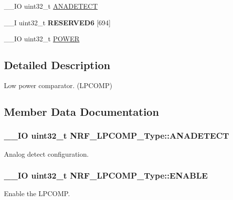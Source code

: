 \begin{DoxyCompactItemize}
\item 
\+\_\+\+\_\+\+I\+O uint32\+\_\+t \hyperlink{struct_n_r_f___l_p_c_o_m_p___type_a3a9d8832c07406639e71d4ef8eebc97d}{A\+N\+A\+D\+E\+T\+E\+C\+T}
\item 
\hypertarget{struct_n_r_f___l_p_c_o_m_p___type_abf695871e852e79340dd0864aaad2f6d}{}\+\_\+\+\_\+\+I uint32\+\_\+t {\bfseries R\+E\+S\+E\+R\+V\+E\+D6} \mbox{[}694\mbox{]}\label{struct_n_r_f___l_p_c_o_m_p___type_abf695871e852e79340dd0864aaad2f6d}

\item 
\+\_\+\+\_\+\+I\+O uint32\+\_\+t \hyperlink{struct_n_r_f___l_p_c_o_m_p___type_a8774f2108593ba450c031acfa5c921b7}{P\+O\+W\+E\+R}
\end{DoxyCompactItemize}


\subsection{Detailed Description}
Low power comparator. (L\+P\+C\+O\+M\+P) 

\subsection{Member Data Documentation}
\hypertarget{struct_n_r_f___l_p_c_o_m_p___type_a3a9d8832c07406639e71d4ef8eebc97d}{}
\subsubsection[{A\+N\+A\+D\+E\+T\+E\+C\+T}]{\setlength{\rightskip}{0pt plus 5cm}\+\_\+\+\_\+\+I\+O uint32\+\_\+t N\+R\+F\+\_\+\+L\+P\+C\+O\+M\+P\+\_\+\+Type\+::\+A\+N\+A\+D\+E\+T\+E\+C\+T}\label{struct_n_r_f___l_p_c_o_m_p___type_a3a9d8832c07406639e71d4ef8eebc97d}
Analog detect configuration. \hypertarget{struct_n_r_f___l_p_c_o_m_p___type_abbe9510d193085731e99182b8bf736db}{}
\subsubsection[{E\+N\+A\+B\+L\+E}]{\setlength{\rightskip}{0pt plus 5cm}\+\_\+\+\_\+\+I\+O uint32\+\_\+t N\+R\+F\+\_\+\+L\+P\+C\+O\+M\+P\+\_\+\+Type\+::\+E\+N\+A\+B\+L\+E}\label{struct_n_r_f___l_p_c_o_m_p___type_abbe9510d193085731e99182b8bf736db}
Enable the L\+P\+C\+O\+M\+P. \hypertarget{struct_n_r_f___l_p_c_o_m_p___type_ac558ee46dfd50e2c09c3d343be838a86}{}
